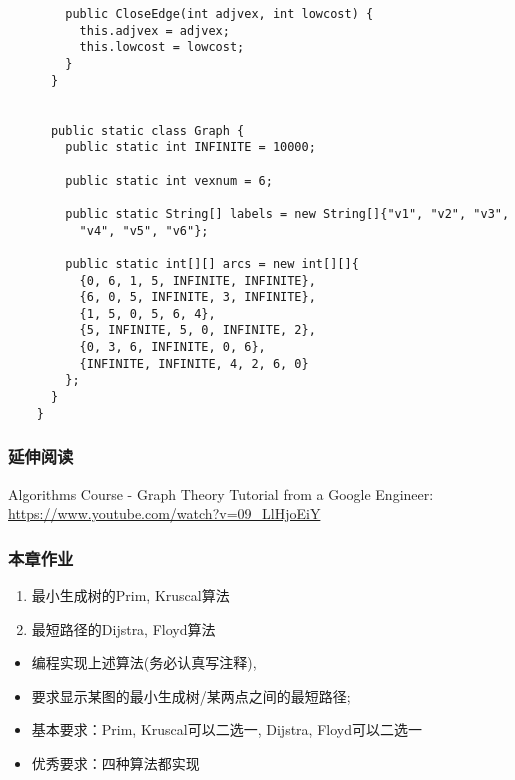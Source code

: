 \begin{frame}
\begin{verbatim}
        public CloseEdge(int adjvex, int lowcost) {
          this.adjvex = adjvex;
          this.lowcost = lowcost;
        }
      }


      public static class Graph {
        public static int INFINITE = 10000;

        public static int vexnum = 6;

        public static String[] labels = new String[]{"v1", "v2", "v3",
          "v4", "v5", "v6"};

        public static int[][] arcs = new int[][]{
          {0, 6, 1, 5, INFINITE, INFINITE},
          {6, 0, 5, INFINITE, 3, INFINITE},
          {1, 5, 0, 5, 6, 4},
          {5, INFINITE, 5, 0, INFINITE, 2},
          {0, 3, 6, INFINITE, 0, 6},
          {INFINITE, INFINITE, 4, 2, 6, 0}
        };
      }
    }
  \end{verbatim}
\end{frame}

\begin{frame}[fragile]
	\frametitle{延伸阅读}
    
    Algorithms Course - Graph Theory Tutorial from a Google Engineer: 
    \url{https://www.youtube.com/watch?v=09_LlHjoEiY}


\end{frame}

\begin{frame}[fragile]
  \frametitle{本章作业}
  \begin{enumerate}
  \item 最小生成树的Prim, Kruscal算法
  \item 最短路径的Dijstra, Floyd算法
  \end{enumerate}

  \begin{itemize}
  \item 编程实现上述算法(务必认真写注释),
  \item 要求显示某图的最小生成树/某两点之间的最短路径;
  \item 基本要求：Prim, Kruscal可以二选一, Dijstra, Floyd可以二选一
  \item 优秀要求：四种算法都实现
  \end{itemize}
\end{frame}